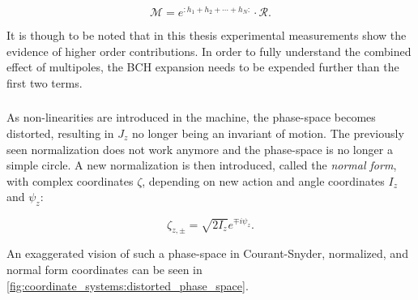 \begin{equation}
   \mathcal{M} = e^{:h_1 + h_2 + \cdots + h_N:} \cdot \mathcal{R}.
\end{equation}

It is though to be noted that in this thesis experimental measurements show the evidence of higher
order contributions. In order to fully understand the combined effect of multipoles, the BCH
expansion needs to be expended further than the first two terms.



\subsubsection{}

As non-linearities are introduced in the machine, the phase-space becomes distorted, resulting in
$J_z$ no longer being an invariant of motion. The previously seen normalization does not work
anymore and the phase-space is no longer a simple circle. A new normalization is then introduced,
called the \textit{normal form}, with complex coordinates $\zeta$, depending on new action and
angle coordinates $I_z$ and $\psi_z$:

\begin{equation}
    \zeta_{z,\pm} = \sqrt{2I_z} e^{\mp i \psi_z}.
    \label{eq:coordinate_systems:normal_form_coordinates}
\end{equation}

An exaggerated vision of such a phase-space in Courant-Snyder, normalized, and normal form
coordinates can be seen in \cref{fig:coordinate_systems:distorted_phase_space}.

